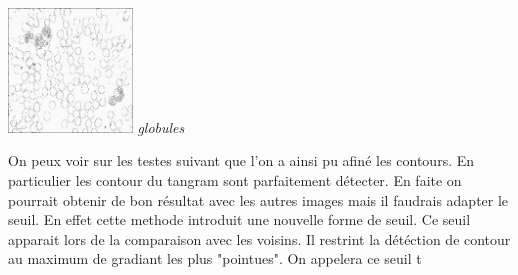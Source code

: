 \documentclass[a4,12pt]{article}
\begin{document}
\begin{minipage}[c]{0.20\linewidth}
	\begin{center}
		\includegraphics[width = 33mm]{./img/p2test_grad_fin_globules_t10.jpg}
		\textit{globules}
	\end{center}
\end{minipage}

On peux voir sur les testes suivant que l'on a ainsi pu afiné les contours.
En particulier les contour du tangram sont parfaitement détecter.
En faite on pourrait obtenir de bon résultat avec les autres images mais il faudrais adapter le seuil.
En effet cette methode introduit une nouvelle forme de seuil.
Ce seuil apparait lors de la comparaison avec les voisins. Il restrint la détéction de contour au maximum de gradiant les plus "pointues".
On appelera ce seuil t\\
\end{document}
